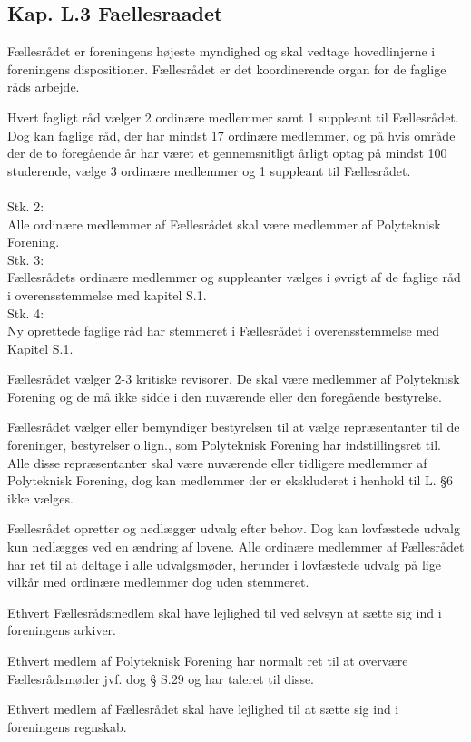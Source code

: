 \begin{list}
\subsection{Kap. L.3 Faellesraadet}
\label{kap:faellesraadet}
\item Fællesrådet er foreningens højeste myndighed og skal vedtage hovedlinjerne i foreningens dispositioner. Fællesrådet er det koordinerende organ for de faglige råds arbejde.

\item Hvert fagligt råd vælger 2 ordinære medlemmer samt 1 suppleant til Fællesrådet. Dog kan faglige råd, der har mindst 17 ordinære medlemmer, og på hvis område der de to foregående år har været et gennemsnitligt årligt optag på mindst 100 studerende, vælge 3 ordinære medlemmer og 1 suppleant til Fællesrådet.\\
\\
Stk. 2: \\
Alle ordinære medlemmer af Fællesrådet skal være medlemmer af Polyteknisk Forening.\\
Stk. 3: \\
Fællesrådets ordinære medlemmer og suppleanter vælges i øvrigt af de faglige råd i overensstemmelse med kapitel S.1.
\\
Stk. 4: \\
Ny oprettede faglige råd har stemmeret i Fællesrådet i overensstemmelse med Kapitel S.1.

\item Fællesrådet vælger 2-3 kritiske revisorer. De skal være medlemmer af Polyteknisk Forening og de må ikke sidde i den nuværende eller den foregående bestyrelse. 

\item Fællesrådet vælger eller bemyndiger bestyrelsen til at vælge repræsentanter til de foreninger, bestyrelser o.lign., som Polyteknisk Forening har indstillingsret til. Alle disse repræsentanter skal være nuværende eller tidligere medlemmer af Polyteknisk Forening, dog kan medlemmer der er ekskluderet i henhold til L. §6 ikke vælges.

\item Fællesrådet opretter og nedlægger udvalg efter behov. Dog kan lovfæstede udvalg kun nedlægges ved en ændring af lovene. Alle ordinære medlemmer af Fællesrådet har ret til at deltage i alle udvalgsmøder, herunder i lovfæstede udvalg på lige vilkår med ordinære medlemmer dog uden stemmeret.

\item Ethvert Fællesrådsmedlem skal have lejlighed til ved selvsyn at sætte sig ind i foreningens arkiver.
\item Ethvert medlem af Polyteknisk Forening har normalt ret til at overvære Fællesrådsmøder jvf. dog § S.29 og har taleret til disse.
\item Ethvert medlem af Fællesrådet skal have lejlighed til at sætte sig ind i foreningens regnskab.



\end{list}
